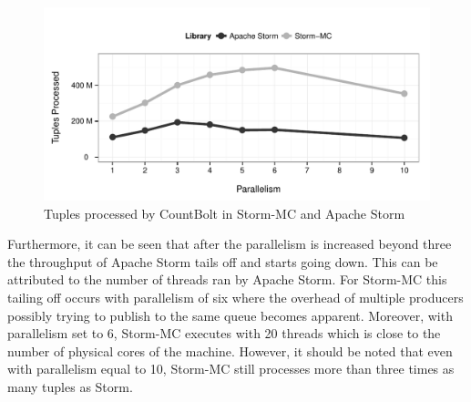 \documentclass[bsc,logo,frontabs,twoside,singlespacing,normalheadings,parskip]{infthesis}\usepackage[]{graphicx}\usepackage[]{color}
\makeatletter
\def\maxwidth{ %
  \ifdim\Gin@nat@width>\linewidth
    \linewidth
  \else
    \Gin@nat@width
  \fi
}
\newenvironment{kframe}{%
 \def\at@end@of@kframe{}%
 \ifinner\ifhmode%
  \def\at@end@of@kframe{\end{minipage}}%
  \begin{minipage}{\columnwidth}%
 \fi\fi%
 \def\FrameCommand##1{\hskip\@totalleftmargin \hskip-\fboxsep
 \colorbox{shadecolor}{##1}\hskip-\fboxsep
     \hskip-\linewidth \hskip-\@totalleftmargin \hskip\columnwidth}%
 \MakeFramed {\advance\hsize-\width
   \@totalleftmargin\z@ \linewidth\hsize
   \@setminipage}}%
 {\par\unskip\endMakeFramed%
 \at@end@of@kframe}
\newenvironment{knitrout}{}{} %
\makeatother
\begin{document}
\begin{knitrout}
\color{fgcolor}\begin{kframe}


{\ttfamily\noindent\itshape\color{messagecolor}{\#\# Loading required package: methods}}\end{kframe}\begin{figure}[!htb]

{\centering \includegraphics[width=\maxwidth]{figure/countbolt-plot-1} 

}

\caption[Tuples processed by CountBolt in Storm-MC and Apache Storm]{Tuples processed by CountBolt in Storm-MC and Apache Storm}\label{fig:countbolt-plot}
\end{figure}


\end{knitrout}

Furthermore, it can be seen that after the parallelism is increased beyond three the throughput of Apache Storm tails off and starts going down. This can be attributed to the number of threads ran by Apache Storm. For Storm-MC this tailing off occurs with parallelism of six where the overhead of multiple producers possibly trying to publish to the same queue becomes apparent. Moreover, with parallelism set to 6, Storm-MC executes with 20 threads which is close to the number of physical cores of the machine. However, it should be noted that even with parallelism equal to 10, Storm-MC still processes more than three times as many tuples as Storm.
\end{document}
